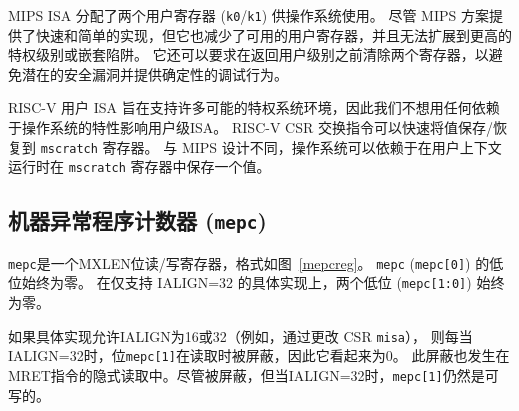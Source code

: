 \begin{commentary}
MIPS ISA 分配了两个用户寄存器 ({\tt k0}/{\tt k1}) 供操作系统使用。 
尽管 MIPS 方案提供了快速和简单的实现，但它也减少了可用的用户寄存器，并且无法扩展到更高的特权级别或嵌套陷阱。 
它还可以要求在返回用户级别之前清除两个寄存器，以避免潜在的安全漏洞并提供确定性的调试行为。

RISC-V 用户 ISA 旨在支持许多可能的特权系统环境，因此我们不想用任何依赖于操作系统的特性影响用户级ISA。 
RISC-V CSR 交换指令可以快速将值保存/恢复到 {\tt mscratch} 寄存器。 
与 MIPS 设计不同，操作系统可以依赖于在用户上下文运行时在 {\tt mscratch} 寄存器中保存一个值。
\end{commentary}


\subsection{机器异常程序计数器 ({\tt mepc})}

\iffalse
{\tt mepc} is an MXLEN-bit read/write register formatted as shown in
Figure~\ref{mepcreg}.  The low bit of {\tt mepc} ({\tt mepc[0]}) is
always zero.  On implementations that support only IALIGN=32, the two low bits
({\tt mepc[1:0]}) are always zero.

If an implementation allows IALIGN to be either 16 or 32 (by
changing CSR {\tt misa}, for example), then, whenever IALIGN=32, bit
{\tt mepc[1]} is masked on reads so that it appears to be 0.  This
masking occurs also for the implicit read by the MRET instruction.
Though masked, {\tt mepc[1]} remains writable when IALIGN=32.

{\tt mepc} is a \warl\ register that must be able to hold all valid
virtual addresses.  It need not be capable of holding all possible invalid
addresses.
Prior to writing {\tt mepc}, implementations may convert an invalid address
into some other invalid address that {\tt mepc} is capable of holding.
\fi

{\tt mepc}是一个MXLEN位读/写寄存器，格式如图~\ref{mepcreg}。 {\tt mepc} ({\tt mepc[0]}) 的低位始终为零。
在仅支持 IALIGN=32 的具体实现上，两个低位 ({\tt mepc[1:0]}) 始终为零。

如果具体实现允许IALIGN为16或32（例如，通过更改 CSR {\tt misa}），
则每当 IALIGN=32时，位{\tt mepc[1]}在读取时被屏蔽，因此它看起来为0。
此屏蔽也发生在MRET指令的隐式读取中。尽管被屏蔽，但当IALIGN=32时，{\tt mepc[1]}仍然是可写的。

